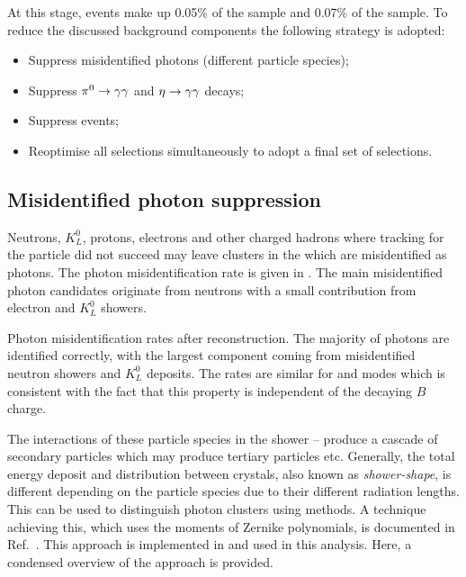 At this stage, \BtoXsgamma events make up 0.05\% of the \feiBp sample and 0.07\% of the \feiBz sample.
To reduce the discussed background components the following strategy is adopted:
\begin{itemize}
    \item Suppress misidentified photons (different particle species);
    \item Suppress $\pi^0\rightarrow\gamma\gamma$ and $\eta\rightarrow\gamma\gamma$ decays;
    \item Suppress \epem\ra\qqbar events;
    \item Reoptimise all selections simultaneously to adopt a final set of selections.
\end{itemize}

\subsection{Misidentified photon suppression}\label{sec:selection_clusZMVA}

Neutrons, $K_L^0$, protons, electrons and other charged hadrons where tracking for the particle did not succeed may leave clusters in the \ECL which are misidentified as photons.
The photon misidentification rate is given in .
The main misidentified photon candidates originate from neutrons with a small contribution from electron and $K_L^0$ showers.

\begin{table}[htbp!]
    \centering
    \caption{\label{tab:misidentified_photons} Photon misidentification rates after reconstruction.
    The majority of photons are identified correctly, with the largest component coming from misidentified neutron showers and $K_L^0$ deposits.
    The rates are similar for \feiBp and \feiBz modes which is consistent with the fact that this property is independent of the decaying $B$ charge.}
    
\end{table}

The interactions of these particle species in the \ECL shower -- produce a cascade of secondary particles which may produce tertiary particles etc.
Generally, the total energy deposit and distribution between \ECL crystals, also known as \textit{shower-shape}, is different depending on the particle species due to their different radiation lengths.
This can be used to distinguish photon clusters using \MVA methods.
A technique achieving this, which uses the moments of Zernike polynomials, is documented in Ref.~\cite{Hershenhorn:2468}.
This approach is implemented in \basftwo and used in this analysis.
Here, a condensed overview of the approach is provided.

